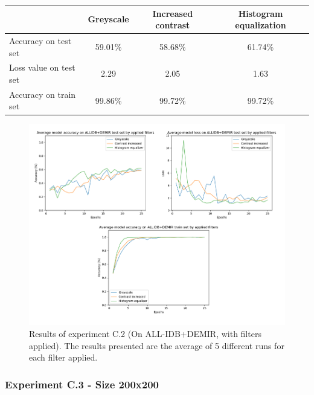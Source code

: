 \documentclass[11pt, openany]{report}
\theoremstyle{plain}
\theoremstyle{definition}
\theoremstyle{remark}
\begin{document}
\begin{center}
\begin{tabular}{|l|c|c|c|}
  \hline
   & \textbf{Greyscale} & \textbf{Increased contrast} & \textbf{Histogram equalization} \\
  \hline
  Accuracy on test set & 59.01\% & 58.68\% & 61.74\% \\
  Loss value on test set & 2.29 & 2.05 &  1.63\\ 
  Accuracy on train set & 99.86\% & 99.72\% & 99.72\% \\ 
  \hline
\end{tabular}
\label{table:results-C2}
\end{center}


\begin{figure}[H]
  \centering
  \includegraphics[scale=0.5]{Code/ch6-LeukemiaSubtypes/figures_result/LEUK-SUBTYPES/leukSub-filters.PNG}
  \caption{Results of experiment C.2 (On ALL-IDB+DEMIR, with filters applied). The results presented are the average of 5 different runs for each filter applied.}
  \label{fig:results-C2}
\end{figure}


\subsubsection{Experiment C.3 - Size 200x200}
\end{document}
